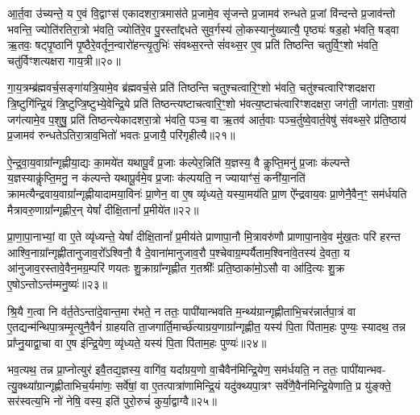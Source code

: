आ॒र्त॒वा उ॑च्यन्ते॒ य ए॒वं वि॒द्वाꣳस॑ एकादशरा॒त्रमास॑ते प्र॒जामे॒व सृ॑जन्ते प्र॒जामव॑ रुन्धते प्र॒जां वि॑न्दन्ते प्र॒जाव॑न्तो भवन्ति॒ ज्योति॑रतिरा॒त्रो भ॑वति॒ ज्योति॑रे॒व पु॒रस्ता᳚द्दधते सुव॒र्गस्य॑ लो॒कस्यानु॑ख्यात्यै॒ पृष्ठ्यः॑ षड॒हो भ॑वति॒ षड्वा ऋ॒तवः॒ षट्पृ॒ष्ठानि॑ पृ॒ष्ठैरे॒वर्तून॒न्वारो॑हन्त्यृ॒तुभिः॑ संवथ्स॒रन्ते सं॑वथ्स॒र ए॒व प्रति॑ तिष्ठन्ति चतुर्वि॒ꣳ॒शो भ॑वति॒ चतु॑र्विꣳशत्यक्षरा गाय॒त्री॥२०॥

गा॒य॒त्रम्ब्र॑ह्मवर्च॒सङ्गा॑यत्रि॒यामे॒व ब्र॑ह्मवर्च॒से प्रति॑ तिष्ठन्ति चतुश्चत्वारि॒ꣳ॒शो भ॑वति॒ चतु॑श्चत्वारिꣳशदक्षरा त्रि॒ष्टुगि॑न्द्रि॒यं त्रि॒ष्टुप्त्रि॒ष्टुभ्ये॒वेन्द्रि॒ये प्रति॑ तिष्ठन्त्यष्टाचत्वारि॒ꣳ॒शो भ॑वत्य॒ष्टाच॑त्वारिꣳशदक्षरा॒ जग॑ती॒ जाग॑ताः प॒शवो॒ जग॑त्यामे॒व प॒शुषु॒ प्रति॑ तिष्ठन्त्येकादशरा॒त्रो भ॑वति॒ पञ्च॒ वा ऋ॒तव॑ आर्त॒वाः पञ्च॒र्तुष्वे॒वार्त॒वेषु॑ संवथ्स॒रे प्र॑ति॒ष्ठाय॑ प्र॒जामव॑ रुन्धते\-ऽतिरा॒त्राव॒भितो॑ भवतः प्र॒जायै॒ परि॑गृहीत्यै॥२१॥

{\anuvakamend[{तस्मा᳚द्गाय॒त्र्येका॒न्नप॑ञ्चा॒शच्च॑॥६॥}]}

ऐ॒न्द्र॒वा॒य॒वाग्रा᳚न्गृह्णीया॒द्यः का॒मये॑त यथापू॒र्वं प्र॒जाः क॑ल्पेर॒न्निति॑ य॒ज्ञस्य॒ वै कॢप्ति॒मनु॑ प्र॒जाः क॑ल्पन्ते य॒ज्ञस्याकॢ॑प्ति॒मनु॒ न क॑ल्पन्ते यथापू॒र्वमे॒व प्र॒जाः क॑ल्पयति॒ न ज्यायाꣳ॑सं॒ कनी॑या॒नति॑ क्रामत्यैन्द्रवाय॒वाग्रा᳚न्गृह्णीयादामया॒विनः॑ प्रा॒णेन॒ वा ए॒ष व्यृ॑ध्यते॒ यस्या॒मय॑ति प्रा॒ण ऐ᳚न्द्रवाय॒वः प्रा॒णेनै॒वैन॒ꣳ॒ सम॑र्धयति मैत्रावरु॒णाग्रा᳚न्गृह्णीर॒न् येषां᳚ दीक्षि॒तानां᳚ प्र॒मीये॑त॥२२॥

प्रा॒णा॒पा॒नाभ्यां॒ वा ए॒ते व्यृ॑ध्यन्ते॒ येषां᳚ दीक्षि॒तानां᳚ प्र॒मीय॑ते प्राणापा॒नौ मि॒त्रावरु॑णौ प्राणापा॒नावे॒व मु॑ख॒तः परि॑ हरन्त आश्वि॒नाग्रा᳚न्गृह्णीतानुजाव॒रो᳚\-ऽश्विनौ॒ वै दे॒वाना॑मानुजाव॒रौ प॒श्चेवाग्र॒म्पर्यैताम॒श्विना॑वे॒तस्य॑ दे॒वता॒ य आ॑नुजाव॒रस्तावे॒वैन॒मग्र॒म्परि॑ णयतः शु॒क्राग्रा᳚न्गृह्णीत ग॒तश्रीः᳚ प्रति॒ष्ठाका॑मो॒\-ऽसौ वा आ॑दि॒त्यः शु॒क्र ए॒षो\-ऽन्तो\-ऽन्त॑म्मनु॒ष्यः॑॥२३॥

श्रि॒यै ग॒त्वा नि व॑र्त॒ते\-ऽन्ता॑दे॒वान्त॒मा र॑भते॒ न ततः॒ पापी॑यान्भवति म॒न्थ्य॑ग्रान्गृह्णीताभि॒चर॑न्नार्तपा॒त्रं वा ए॒तद्यन्म॑न्थिपा॒त्रम्मृ॒त्युनै॒वैनं॑ ग्राहयति ता॒जगार्ति॒मार्च्छ॑त्याग्रय॒णाग्रा᳚न्गृह्णीत॒ यस्य॑ पि॒ता पि॑ताम॒हः पुण्यः॒ स्यादथ॒ तन्न प्रा᳚प्नु॒याद्वा॒चा वा ए॒ष इ॑न्द्रि॒येण॒ व्यृ॑ध्यते॒ यस्य॑ पि॒ता पि॑ताम॒हः पुण्यः॑॥२४॥

भव॒त्यथ॒ तन्न प्रा॒प्नोत्युर॑ इवै॒तद्य॒ज्ञस्य॒ वागि॑व॒ यदा᳚ग्रय॒णो वा॒चैवैन॑मिन्द्रि॒येण॒ सम॑र्धयति॒ न ततः॒ पापी॑यान्भव- त्यु॒क्थ्या᳚ग्रान्गृह्णीताभिच॒र्यमा॑णः॒ सर्वे॑षां॒ वा ए॒तत्पात्रा॑णामिन्द्रि॒यं यदु॑क्थ्यपा॒त्रꣳ सर्वे॑णै॒वैन॑मिन्द्रि॒येणाति॒ प्र यु॑ङ्क्ते॒ सर॑स्वत्य॒भि नो॑ नेषि॒ वस्य॒ इति॑ पुरो॒रुचं॑ कुर्या॒द्वाग्वै॥२५॥

